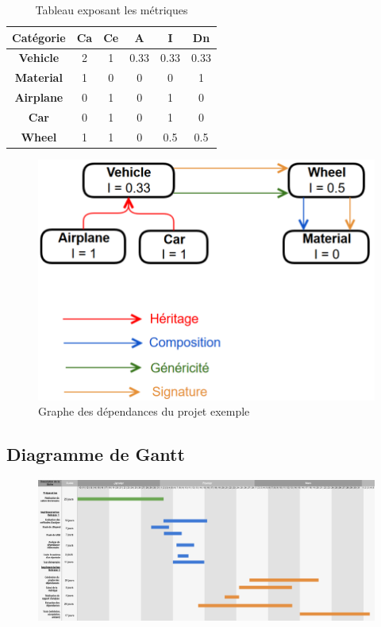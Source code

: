 \documentclass{scrartcl}
\begin{document}
\begin{table}[H]\caption{Tableau exposant les métriques}
    \centering
    \begin{tabular}{|c|c|c|c|c|c|}
        \hline
        \textbf{Catégorie} & \textbf{Ca} & \textbf{Ce} & \textbf{A} & \textbf{I} & \textbf{Dn} \\
        \hline
        \textbf{Vehicle} & 2 & 1 & 0.33 & 0.33 & 0.33 \\
        \hline
        \textbf{Material} & 1 & 0 & 0 & 0 & 1 \\
        \hline
        \textbf{Airplane} & 0 & 1 & 0 & 1 & 0  \\
        \hline
        \textbf{Car} & 0 & 1 & 0 & 1 & 0 \\
        \hline
        \textbf{Wheel} & 1 & 1 & 0 & 0.5 & 0.5 \\
        \hline
    \end{tabular}
\end{table}


\begin{figure}
    \centering
    \includegraphics[scale=0.5]{img/gdd_example.png}
    \caption{Graphe des dépendances du projet exemple}
\end{figure}



\subsection{Diagramme de Gantt}
    \begin{figure}
        \centering
        \includegraphics[width=\linewidth, height=\textheight,keepaspectratio]{img/Gantt.png}
    \end{figure}
    
    
    
\end{document}
